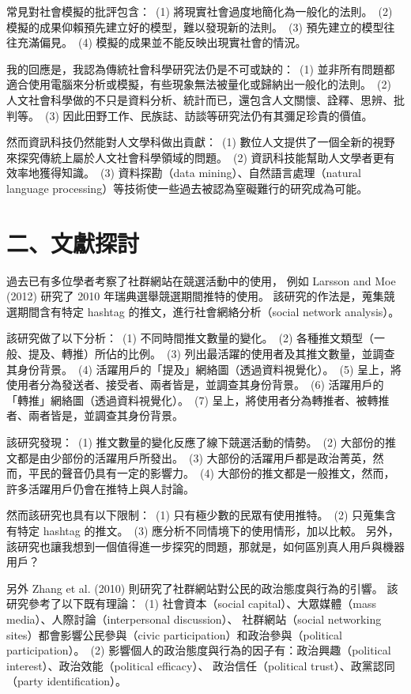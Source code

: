 \documentclass[letterpaper, 10pt, conference]{ieeeconf}   %
\begin{document}
\begin{CJK}{UTF8}{bsmi}
常見對社會模擬的批評包含：%
\,(1) 將現實社會過度地簡化為一般化的法則。%
\,(2) 模擬的成果仰賴預先建立好的模型，難以發現新的法則。%
\,(3) 預先建立的模型往往充滿偏見。%
\,(4) 模擬的成果並不能反映出現實社會的情況。%

我的回應是，我認為傳統社會科學研究法仍是不可或缺的：%
\,(1) 並非所有問題都適合使用電腦來分析或模擬，有些現象無法被量化或歸納出一般化的法則。%
\,(2) 人文社會科學做的不只是資料分析、統計而已，還包含人文關懷、詮釋、思辨、批判等。%
\,(3) 因此田野工作、民族誌、訪談等研究法仍有其彌足珍貴的價值。%

然而資訊科技仍然能對人文學科做出貢獻：%
\,(1) 數位人文提供了一個全新的視野來探究傳統上屬於人文社會科學領域的問題。%
\,(2) 資訊科技能幫助人文學者更有效率地獲得知識。%
\,(3) 資料探勘（data mining）、自然語言處理（natural language processing）等技術使一些過去被認為窒礙難行的研究成為可能。%

\section*{二、文獻探討}

過去已有多位學者考察了社群網站在競選活動中的使用，%
例如 Larsson and Moe (2012) 研究了 2010 年瑞典選舉競選期間推特的使用。\cite{c1} %
該研究的作法是，蒐集競選期間含有特定 hashtag 的推文，進行社會網絡分析（social network analysis）。%

該研究做了以下分析：%
\,(1) 不同時間推文數量的變化。%
\,(2) 各種推文類型（一般、提及、轉推）所佔的比例。%
\,(3) 列出最活躍的使用者及其推文數量，並調查其身份背景。%
\,(4) 活躍用戶的「提及」網絡圖（透過資料視覺化）。%
\,(5) 呈上，將使用者分為發送者、接受者、兩者皆是，並調查其身份背景。%
\,(6) 活躍用戶的「轉推」網絡圖（透過資料視覺化）。%
\,(7) 呈上，將使用者分為轉推者、被轉推者、兩者皆是，並調查其身份背景。%

該研究發現：%
\,(1) 推文數量的變化反應了線下競選活動的情勢。%
\,(2) 大部份的推文都是由少部份的活躍用戶所發出。%
\,(3) 大部份的活躍用戶都是政治菁英，然而，平民的聲音仍具有一定的影響力。%
\,(4) 大部份的推文都是一般推文，然而，許多活躍用戶仍會在推特上與人討論。%

然而該研究也具有以下限制：%
\,(1) 只有極少數的民眾有使用推特。%
\,(2) 只蒐集含有特定 hashtag 的推文。%
\,(3) 應分析不同情境下的使用情形，加以比較。%
另外，該研究也讓我想到一個值得進一步探究的問題，那就是，如何區別真人用戶與機器用戶？%

另外 Zhang et al. (2010) 則研究了社群網站對公民的政治態度與行為的引響。\cite{c2} %
該研究參考了以下既有理論：%
\,(1) 社會資本（social capital）、大眾媒體（mass media）、人際討論（interpersonal discussion）、%
社群網站（social networking sites）都會影響公民參與（civic participation）和政治參與（political participation）。%
\,(2) 影響個人的政治態度與行為的因子有：政治興趣（political interest）、政治效能（political efficacy）、%
政治信任（political trust）、政黨認同（party identification）。%


\end{CJK}
\end{document}

